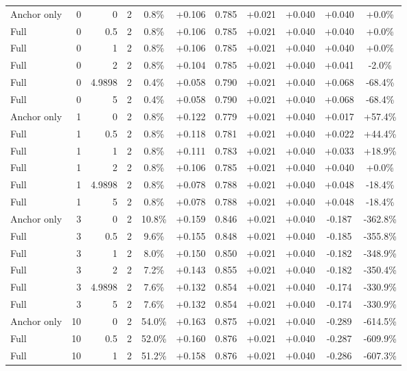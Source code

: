 \begin{table}[htbp]
\begin{tabular}{lrrrccccccc}
Anchor only & 0 & 0 & 2 & 0.8\% & +0.106 & 0.785 & +0.021 & +0.040 & +0.040 & +0.0\% \\
Full & 0 & 0.5 & 2 & 0.8\% & +0.106 & 0.785 & +0.021 & +0.040 & +0.040 & +0.0\% \\
Full & 0 & 1 & 2 & 0.8\% & +0.106 & 0.785 & +0.021 & +0.040 & +0.040 & +0.0\% \\
Full & 0 & 2 & 2 & 0.8\% & +0.104 & 0.785 & +0.021 & +0.040 & +0.041 & -2.0\% \\
Full & 0 & 4.9898 & 2 & 0.4\% & +0.058 & 0.790 & +0.021 & +0.040 & +0.068 & -68.4\% \\
Full & 0 & 5 & 2 & 0.4\% & +0.058 & 0.790 & +0.021 & +0.040 & +0.068 & -68.4\% \\
Anchor only & 1 & 0 & 2 & 0.8\% & +0.122 & 0.779 & +0.021 & +0.040 & +0.017 & +57.4\% \\
Full & 1 & 0.5 & 2 & 0.8\% & +0.118 & 0.781 & +0.021 & +0.040 & +0.022 & +44.4\% \\
Full & 1 & 1 & 2 & 0.8\% & +0.111 & 0.783 & +0.021 & +0.040 & +0.033 & +18.9\% \\
Full & 1 & 2 & 2 & 0.8\% & +0.106 & 0.785 & +0.021 & +0.040 & +0.040 & +0.0\% \\
Full & 1 & 4.9898 & 2 & 0.8\% & +0.078 & 0.788 & +0.021 & +0.040 & +0.048 & -18.4\% \\
Full & 1 & 5 & 2 & 0.8\% & +0.078 & 0.788 & +0.021 & +0.040 & +0.048 & -18.4\% \\
Anchor only & 3 & 0 & 2 & 10.8\% & +0.159 & 0.846 & +0.021 & +0.040 & -0.187 & -362.8\% \\
Full & 3 & 0.5 & 2 & 9.6\% & +0.155 & 0.848 & +0.021 & +0.040 & -0.185 & -355.8\% \\
Full & 3 & 1 & 2 & 8.0\% & +0.150 & 0.850 & +0.021 & +0.040 & -0.182 & -348.9\% \\
Full & 3 & 2 & 2 & 7.2\% & +0.143 & 0.855 & +0.021 & +0.040 & -0.182 & -350.4\% \\
Full & 3 & 4.9898 & 2 & 7.6\% & +0.132 & 0.854 & +0.021 & +0.040 & -0.174 & -330.9\% \\
Full & 3 & 5 & 2 & 7.6\% & +0.132 & 0.854 & +0.021 & +0.040 & -0.174 & -330.9\% \\
Anchor only & 10 & 0 & 2 & 54.0\% & +0.163 & 0.875 & +0.021 & +0.040 & -0.289 & -614.5\% \\
Full & 10 & 0.5 & 2 & 52.0\% & +0.160 & 0.876 & +0.021 & +0.040 & -0.287 & -609.9\% \\
Full & 10 & 1 & 2 & 51.2\% & +0.158 & 0.876 & +0.021 & +0.040 & -0.286 & -607.3\% \\

\end{tabular}
\end{table}
